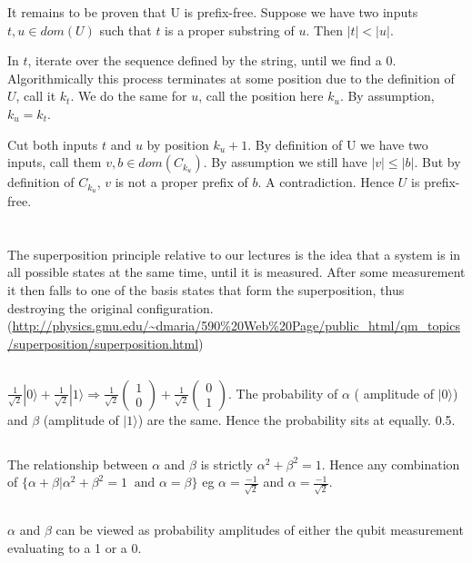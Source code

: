 \documentclass{article}
\begin{document}
It remains to be proven that U is prefix-free. Suppose we have two inputs $t,u \in dom(U)$ such that $t$ is a proper substring of $u$. Then $|t| < |u|$.

In $t$, iterate over the sequence defined by the string, until we find a $0$. Algorithmically this process terminates at some position due to the definition of $U$, call it $k_t$. We do the same for $u$, call the position here $k_u$. By assumption, $k_u = k_t$.

Cut both inputs $t$ and $u$ by position $k_u + 1$. By definition of U we have two inputs, call them $v, b \in dom(C_{k_u})$. By assumption we still have $|v| \leq |b|$. But by definition of $C_{k_u}$, $v$ is not a proper prefix of $b$. A contradiction. Hence $U$ is prefix-free.

\section{}

\subsection{}
The superposition principle relative to our lectures is the idea that a system is in all possible states at the same time, until it is measured. After some measurement it then falls to one of the basis states that form the superposition, thus destroying the original configuration. (\url{http://physics.gmu.edu/~dmaria/590%20Web%20Page/public_html/qm_topics/superposition/superposition.html})

\subsection{}
$\frac{1}{\sqrt{2}} | 0\rangle + \frac{1}{\sqrt{2}} | 1\rangle \Rightarrow \frac{1}{\sqrt{2}} \begin{pmatrix} 1 \\ 0 \end{pmatrix} + \frac{1}{\sqrt{2}} \begin{pmatrix} 0 \\ 1 \end{pmatrix}$. The probability of $\alpha$ ( amplitude of $| 0\rangle$) and $\beta$ (amplitude of $| 1\rangle$) are the same. Hence the probability sits at equally. 0.5.

\subsection{}
The relationship between $\alpha$ and $\beta$ is strictly $\alpha^2 + \beta^2 = 1$. Hence any combination of $\{\alpha + \beta | \alpha^2 + \beta^2 = 1\ \text{ and } \alpha = \beta \}$ eg $\alpha = \frac{-1}{\sqrt{2}}$ and $\alpha = \frac{-1}{\sqrt{2}}$.

\subsection{}
$\alpha$ and $\beta$ can be viewed as probability amplitudes of either the qubit measurement evaluating to a 1 or a 0.
\end{document}
